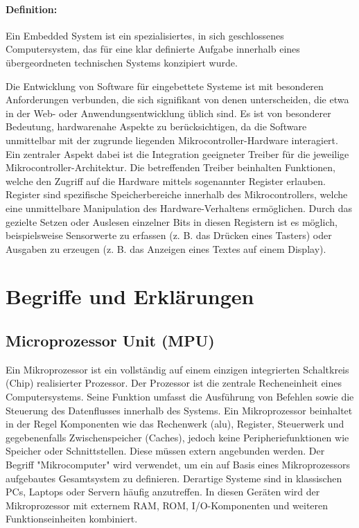 \paragraph{Definition:}
Ein Embedded System ist ein spezialisiertes, in sich geschlossenes Computersystem, das für eine klar definierte Aufgabe innerhalb eines übergeordneten technischen Systems konzipiert wurde.

\vspace{6 mm}

Die Entwicklung von Software für eingebettete Systeme ist mit besonderen Anforderungen verbunden, die sich signifikant von denen unterscheiden, die etwa in der Web- oder Anwendungsentwicklung üblich sind.
Es ist von besonderer Bedeutung, hardwarenahe Aspekte zu berücksichtigen, da die Software unmittelbar mit der zugrunde liegenden Mikrocontroller-Hardware interagiert.
Ein zentraler Aspekt dabei ist die Integration geeigneter Treiber für die jeweilige Mikrocontroller-Architektur.
Die betreffenden Treiber beinhalten Funktionen, welche den Zugriff auf die Hardware mittels sogenannter Register erlauben.
Register sind spezifische Speicherbereiche innerhalb des Mikrocontrollers, welche eine unmittelbare Manipulation des Hardware-Verhaltens ermöglichen.
Durch das gezielte Setzen oder Auslesen einzelner Bits in diesen Registern ist es möglich, beispielsweise Sensorwerte zu erfassen (z. B. das Drücken eines Tasters) oder Ausgaben zu erzeugen (z. B. das Anzeigen eines Textes auf einem Display).



\section{Begriffe und Erklärungen}

\subsection*{Microprozessor Unit (MPU)}
Ein Mikroprozessor ist ein vollständig auf einem einzigen integrierten Schaltkreis (Chip) realisierter Prozessor.
Der Prozessor ist die zentrale Recheneinheit eines Computersystems.
Seine Funktion umfasst die Ausführung von Befehlen sowie die Steuerung des Datenflusses innerhalb des Systems. 
Ein Mikroprozessor beinhaltet in der Regel Komponenten wie das Rechenwerk (\gls{alu}), Register, Steuerwerk und gegebenenfalls Zwischenspeicher (Caches), jedoch keine Peripheriefunktionen wie Speicher oder Schnittstellen. 
Diese müssen extern angebunden werden.
Der Begriff "Mikrocomputer" wird verwendet, um ein auf Basis eines Mikroprozessors aufgebautes Gesamtsystem zu definieren. 
Derartige Systeme sind in klassischen PCs, Laptops oder Servern häufig anzutreffen.
In diesen Geräten wird der Mikroprozessor mit externem RAM, ROM, I/O-Komponenten und weiteren Funktionseinheiten kombiniert.


